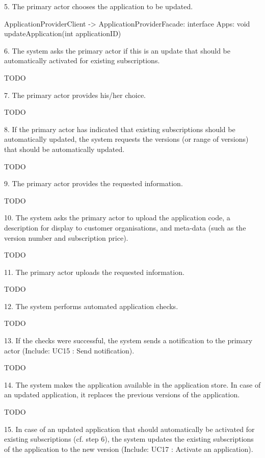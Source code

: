         5. The primary actor chooses the application to be updated.

            ApplicationProviderClient -> ApplicationProviderFacade: interface Apps:
                                                void updateApplication(int applicationID)
                                

        6. The system asks the primary actor if this is an update that should be automatically activated for existing subscriptions.

            TODO

        7. The primary actor provides his/her choice.

            TODO

        8. If the primary actor has indicated that existing subscriptions should be automatically updated, the system requests the versions (or range of versions) that should be automatically updated.

            TODO

        9. The primary actor provides the requested information.

            TODO

        10. The system asks the primary actor to upload the application code, a description for display to customer organisations, and meta-data (such as the version number and subscription price).

            TODO

        11. The primary actor uploads the requested information.

            TODO

        12. The system performs automated application checks.

            TODO

        13. If the checks were successful, the system sends a notification to the primary actor (Include: UC15 : Send notification).

            TODO

        14. The system makes the application available in the application store. In case of an updated application, it replaces the previous versions of the application.

            TODO

        15. In case of an updated application that should automatically be activated for existing subscriptions (cf. step 6), the system updates the existing subscriptions of the application to the new version (Include: UC17 : Activate an application).

